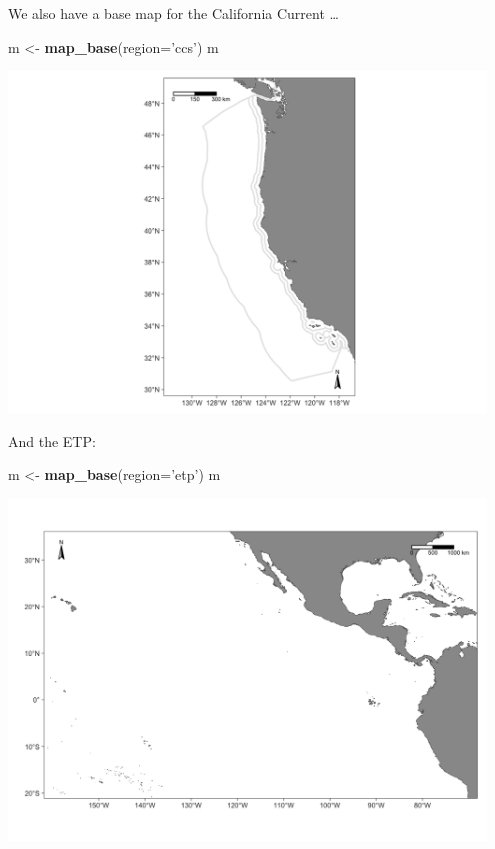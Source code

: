\documentclass[
]{book}
\newenvironment{Shaded}{\begin{snugshade}}{\end{snugshade}}
\newcommand{\DataTypeTok}[1]{\textcolor[rgb]{0.13,0.29,0.53}{#1}}
\newcommand{\KeywordTok}[1]{\textcolor[rgb]{0.13,0.29,0.53}{\textbf{#1}}}
\newcommand{\NormalTok}[1]{#1}
\newcommand{\StringTok}[1]{\textcolor[rgb]{0.31,0.60,0.02}{#1}}
\begin{document}
We also have a base map for the California Current \ldots{}

\begin{Shaded}
\begin{Highlighting}[]
\NormalTok{m <-}\StringTok{ }\KeywordTok{map_base}\NormalTok{(}\DataTypeTok{region=}\StringTok{'ccs'}\NormalTok{)}
\NormalTok{m}
\end{Highlighting}
\end{Shaded}

\includegraphics[width=0.95\textwidth,height=\textheight]{img/map_ccs.png}

And the ETP:

\begin{Shaded}
\begin{Highlighting}[]
\NormalTok{m <-}\StringTok{ }\KeywordTok{map_base}\NormalTok{(}\DataTypeTok{region=}\StringTok{'etp'}\NormalTok{)}
\NormalTok{m}
\end{Highlighting}
\end{Shaded}

\includegraphics[width=0.95\textwidth,height=\textheight]{img/map_etp.png}
\end{document}
